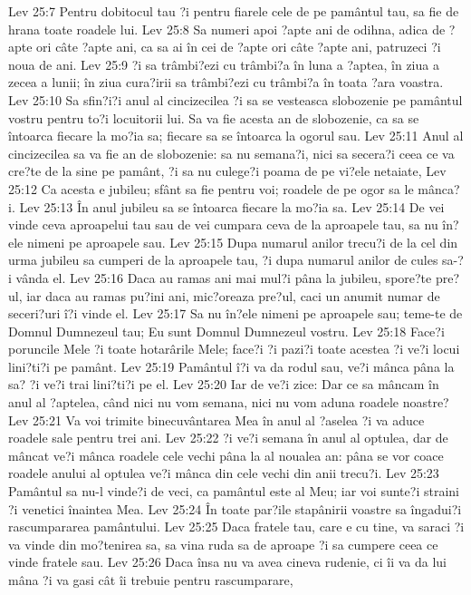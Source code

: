 Lev 25:7  Pentru dobitocul tau ?i pentru fiarele cele de pe pamântul tau, sa fie de hrana toate roadele lui.
Lev 25:8  Sa numeri apoi ?apte ani de odihna, adica de ?apte ori câte ?apte ani, ca sa ai în cei de ?apte ori câte ?apte ani, patruzeci ?i noua de ani.
Lev 25:9  ?i sa trâmbi?ezi cu trâmbi?a în luna a ?aptea, în ziua a zecea a lunii; în ziua cura?irii sa trâmbi?ezi cu trâmbi?a în toata ?ara voastra.
Lev 25:10  Sa sfin?i?i anul al cincizecilea ?i sa se vesteasca slobozenie pe pamântul vostru pentru to?i locuitorii lui. Sa va fie acesta an de slobozenie, ca sa se întoarca fiecare la mo?ia sa; fiecare sa se întoarca la ogorul sau.
Lev 25:11  Anul al cincizecilea sa va fie an de slobozenie: sa nu semana?i, nici sa secera?i ceea ce va cre?te de la sine pe pamânt, ?i sa nu culege?i poama de pe vi?ele netaiate,
Lev 25:12  Ca acesta e jubileu; sfânt sa fie pentru voi; roadele de pe ogor sa le mânca?i.
Lev 25:13  În anul jubileu sa se întoarca fiecare la mo?ia sa.
Lev 25:14  De vei vinde ceva aproapelui tau sau de vei cumpara ceva de la aproapele tau, sa nu în?ele nimeni pe aproapele sau.
Lev 25:15  Dupa numarul anilor trecu?i de la cel din urma jubileu sa cumperi de la aproapele tau, ?i dupa numarul anilor de cules sa-?i vânda el.
Lev 25:16  Daca au ramas ani mai mul?i pâna la jubileu, spore?te pre?ul, iar daca au ramas pu?ini ani, mic?oreaza pre?ul, caci un anumit numar de seceri?uri î?i vinde el.
Lev 25:17  Sa nu în?ele nimeni pe aproapele sau; teme-te de Domnul Dumnezeul tau; Eu sunt Domnul Dumnezeul vostru.
Lev 25:18  Face?i poruncile Mele ?i toate hotarârile Mele; face?i ?i pazi?i toate acestea ?i ve?i locui lini?ti?i pe pamânt.
Lev 25:19  Pamântul î?i va da rodul sau, ve?i mânca pâna la sa? ?i ve?i trai lini?ti?i pe el.
Lev 25:20  Iar de ve?i zice: Dar ce sa mâncam în anul al ?aptelea, când nici nu vom semana, nici nu vom aduna roadele noastre?
Lev 25:21  Va voi trimite binecuvântarea Mea în anul al ?aselea ?i va aduce roadele sale pentru trei ani.
Lev 25:22  ?i ve?i semana în anul al optulea, dar de mâncat ve?i mânca roadele cele vechi pâna la al noualea an: pâna se vor coace roadele anului al optulea ve?i mânca din cele vechi din anii trecu?i.
Lev 25:23  Pamântul sa nu-l vinde?i de veci, ca pamântul este al Meu; iar voi sunte?i straini ?i venetici înaintea Mea.
Lev 25:24  În toate par?ile stapânirii voastre sa îngadui?i rascumpararea pamântului.
Lev 25:25  Daca fratele tau, care e cu tine, va saraci ?i va vinde din mo?tenirea sa, sa vina ruda sa de aproape ?i sa cumpere ceea ce vinde fratele sau.
Lev 25:26  Daca însa nu va avea cineva rudenie, ci îi va da lui mâna ?i va gasi cât îi trebuie pentru rascumparare,
